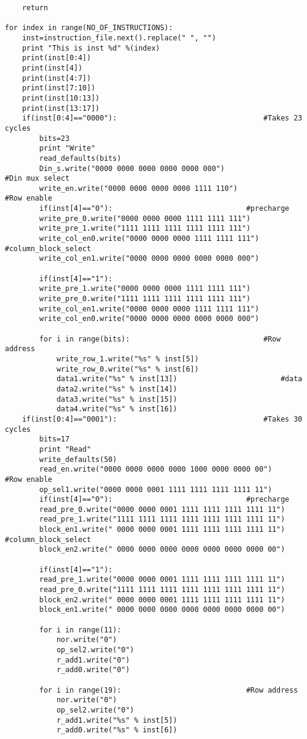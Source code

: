 \begin{lstlisting}
	return
	
for index in range(NO_OF_INSTRUCTIONS):
	inst=instruction_file.next().replace(" ", "")
	print "This is inst %d" %(index)
	print(inst[0:4])
	print(inst[4])  
	print(inst[4:7]) 
	print(inst[7:10])
	print(inst[10:13])
	print(inst[13:17])
	if(inst[0:4]=="0000"):									#Takes 23 cycles
		bits=23		
		print "Write"
		read_defaults(bits)
		Din_s.write("0000 0000 0000 0000 0000 000")					#Din mux select
		write_en.write("0000 0000 0000 0000 1111 110")					#Row enable		
		if(inst[4]=="0"):								#precharge
		write_pre_0.write("0000 0000 0000 1111 1111 111")
		write_pre_1.write("1111 1111 1111 1111 1111 111")	
		write_col_en0.write("0000 0000 0000 1111 1111 111")			#column_block_select
		write_col_en1.write("0000 0000 0000 0000 0000 000")
	
		if(inst[4]=="1"):	
		write_pre_1.write("0000 0000 0000 1111 1111 111")
		write_pre_0.write("1111 1111 1111 1111 1111 111")	
		write_col_en1.write("0000 0000 0000 1111 1111 111")
		write_col_en0.write("0000 0000 0000 0000 0000 000")	
		
		for i in range(bits):								#Row address
			write_row_1.write("%s" % inst[5])
			write_row_0.write("%s" % inst[6])
			data1.write("%s" % inst[13])						#data
			data2.write("%s" % inst[14])
			data3.write("%s" % inst[15])
			data4.write("%s" % inst[16])		
	if(inst[0:4]=="0001"):									#Takes 30 cycles
		bits=17		
		print "Read"
		write_defaults(50)
		read_en.write("0000 0000 0000 0000 1000 0000 0000 00")						#Row enable		
		op_sel1.write("0000 0000 0001 1111 1111 1111 1111 11")
		if(inst[4]=="0"):								#precharge
		read_pre_0.write("0000 0000 0001 1111 1111 1111 1111 11")
		read_pre_1.write("1111 1111 1111 1111 1111 1111 1111 11")	
		block_en1.write(" 0000 0000 0001 1111 1111 1111 1111 11")				#column_block_select
		block_en2.write(" 0000 0000 0000 0000 0000 0000 0000 00")	
	
		if(inst[4]=="1"):	
		read_pre_1.write("0000 0000 0001 1111 1111 1111 1111 11")
		read_pre_0.write("1111 1111 1111 1111 1111 1111 1111 11")	
		block_en2.write(" 0000 0000 0001 1111 1111 1111 1111 11")
		block_en1.write(" 0000 0000 0000 0000 0000 0000 0000 00")	
		
		for i in range(11):								
			nor.write("0")	
			op_sel2.write("0")			
			r_add1.write("0")
			r_add0.write("0")
		
		for i in range(19):								#Row address
			nor.write("0")	
			op_sel2.write("0")			
			r_add1.write("%s" % inst[5])
			r_add0.write("%s" % inst[6])
			

\end{lstlisting}
